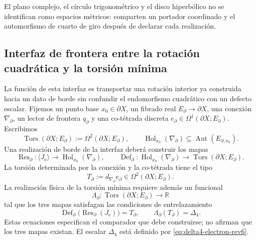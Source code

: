 El plano complejo, el círculo trigonométrico y el disco hiperbólico no se
identifican como espacios métricos: comparten un portador coordinado y el
automorfismo de cuarto de giro después de declarar cada realización.

\subsection{Interfaz de frontera entre la rotación cuadrática y la torsión mínima}
\label{p3-83-c44-s2:sec:interfaz-frontera-rotacion-torsion-minima-rev3}

La función de esta interfaz es transportar una rotación interior ya
construida hacia un dato de borde sin confundir el endomorfismo cuadrático
con un defecto escalar. Fijemos un punto base
\(x_0\in\partial X\), un fibrado real
\(E_{\partial}\to\partial X\), una conexión \(\nabla_{\partial}\), un
lector de frontera \(q_{\partial}\) y una co-tétrada discreta
\(e_{\partial}\in\Omega^1(\partial X;E_{\partial})\). Escribimos
\[
 \operatorname{Tors}(\partial X;E_{\partial})
 :=\Omega^2(\partial X;E_{\partial}),
 \qquad
 \operatorname{Hol}_{x_0}(\nabla_{\partial})
 \subseteq\operatorname{Aut}(E_{\partial,x_0}).
\]
Una realización de borde de la interfaz deberá construir los mapas
\[
 \operatorname{Res}_{\partial}:
 \langle J_{\mathrm e}\rangle
 \longrightarrow\operatorname{Hol}_{x_0}(\nabla_{\partial}),
 \qquad
 \operatorname{Def}_{\partial}:
 \operatorname{Hol}_{x_0}(\nabla_{\partial})
 \longrightarrow\operatorname{Tors}(\partial X;E_{\partial}).
\]
La torsión determinada por la conexión y la co-tétrada tiene el tipo
\begin{equation}
 T_{\partial}
 :=d_{\nabla_{\partial}}e_{\partial}
 \in\Omega^2(\partial X;E_{\partial}).
 \label{p3-83-c44-s2:eq:torsion-borde-interfaz-euler-rev3}
\end{equation}
La realización física de la torsión mínima requiere además un funcional
\begin{equation}
 \Lambda_{\partial}:
 \operatorname{Tors}(\partial X;E_{\partial})\longrightarrow\mathbb R
 \label{p3-83-c44-s2:eq:funcional-borde-delta4-interfaz-rev3}
\end{equation}
tal que los tres mapas satisfagan las condiciones de entrelazamiento
\begin{equation}
 \operatorname{Def}_{\partial}
 \bigl(\operatorname{Res}_{\partial}(J_{\mathrm e})\bigr)=T_{\partial},
 \qquad
 \Lambda_{\partial}(T_{\partial})=\Delta_4.
 \label{p3-83-c44-s2:eq:condiciones-borde-delta4-interfaz-rev3}
\end{equation}
Estas ecuaciones especifican el comparador que debe construirse; no afirman
que los tres mapas existan. El escalar \(\Delta_4\) está definido por
\cref{eq:delta4-electron-rev6}.

